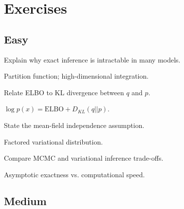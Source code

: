 
\section*{Exercises}

\subsection*{Easy}

\begin{exercisebox}[easy]
\begin{problem}
Explain why exact inference is intractable in many models.
\end{problem}
\begin{hintbox}
Partition function; high-dimensional integration.
\end{hintbox}
\end{exercisebox}


\begin{exercisebox}[easy]
\begin{problem}
Relate ELBO to KL divergence between $q$ and $p$.
\end{problem}
\begin{hintbox}
$\log p(x) = \text{ELBO} + D_{KL}(q||p)$.
\end{hintbox}
\end{exercisebox}


\begin{exercisebox}[easy]
\begin{problem}
State the mean-field independence assumption.
\end{problem}
\begin{hintbox}
Factored variational distribution.
\end{hintbox}
\end{exercisebox}


\begin{exercisebox}[easy]
\begin{problem}[MCMC vs. VI]
Compare MCMC and variational inference trade-offs.
\end{problem}
\begin{hintbox}
Asymptotic exactness vs. computational speed.
\end{hintbox}
\end{exercisebox}


\subsection*{Medium}

